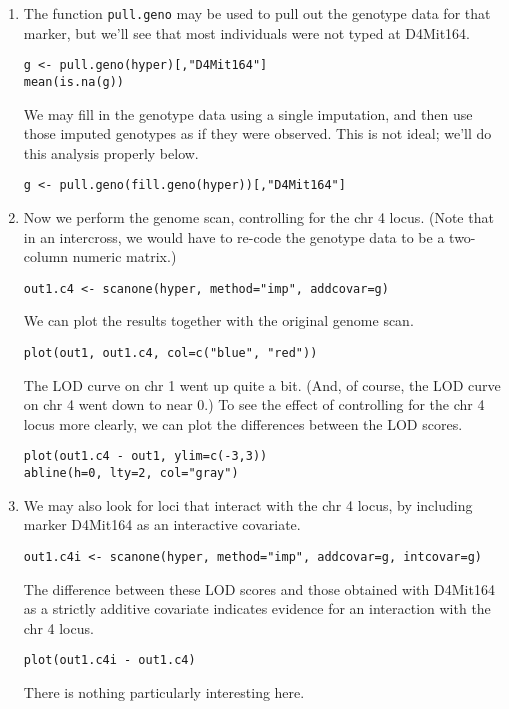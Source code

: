\documentclass[10pt,letterpaper]{article}
\newcommand{\usercolor}{\color [named]{BlueViolet}}
\begin{document}
\begin{enumerate}
\item  The function \verb-pull.geno- may be used to pull out the genotype
  data for that marker, but we'll see that most individuals were not
  typed at D4Mit164.

  \usercolor \verb|g <- pull.geno(hyper)[,"D4Mit164"]| \\
  \verb|mean(is.na(g))| \normalcolor

  We may fill in the genotype data using a single imputation,
  and then use those imputed genotypes as if they were observed.  This
  is not ideal; we'll do this analysis properly below.

  \usercolor \verb|g <- pull.geno(fill.geno(hyper))[,"D4Mit164"]|
  \normalcolor 

\item Now we perform the genome scan, controlling for the chr 4
  locus. (Note that in an intercross, we would have to re-code the genotype
  data to be a two-column numeric matrix.)

  \usercolor
  \verb|out1.c4 <- scanone(hyper, method="imp", addcovar=g)|
  \normalcolor

  We can plot the results together with the original genome scan.

\usercolor \verb|plot(out1, out1.c4, col=c("blue", "red"))| \normalcolor

  The LOD curve on chr 1 went up quite a bit.  (And, of course,
  the LOD curve on chr 4 went down to near 0.)  To see the
  effect of controlling for the chr 4 locus more clearly, we
  can plot the differences between the LOD scores.

  \usercolor \verb|plot(out1.c4 - out1, ylim=c(-3,3))| \\
  \verb|abline(h=0, lty=2, col="gray")| \normalcolor

\item We may also look for loci that interact with the chr 4
  locus, by including marker D4Mit164 as
  an interactive covariate. 

  \usercolor
  \verb|out1.c4i <- scanone(hyper, method="imp", addcovar=g, intcovar=g)| 
\normalcolor

  The difference between these LOD scores and those obtained with D4Mit164 as a
  strictly additive covariate indicates evidence for an interaction with the
  chr 4 locus.

  \usercolor \verb|plot(out1.c4i - out1.c4)| \normalcolor

  There is nothing particularly interesting here.


\end{enumerate}
\end{document}

